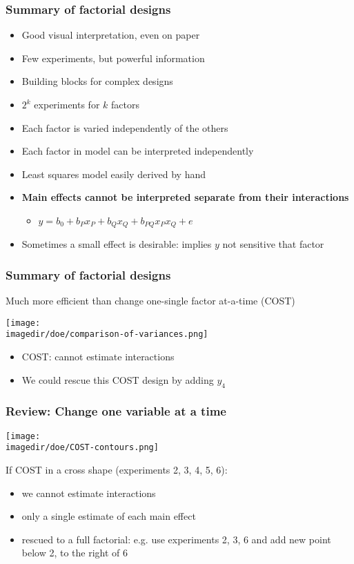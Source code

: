 \begin{frame}\frametitle{Summary of factorial designs}
	\begin{itemize}
		\item	Good visual interpretation, even on paper
		\item	Few experiments, but powerful information
		\item	Building blocks for complex designs
		\item	$2^k$ experiments for $k$ factors
		\item	Each factor is varied independently of the others
		\item	Each factor in model can be interpreted independently
		\item	Least squares model easily derived by hand
		\item	\textbf{Main effects cannot be interpreted separate from their interactions}
		\begin{itemize}
			\item	$y = b_0 + b_P x_P + b_Q x_Q + b_{PQ} x_Px_Q + e$
		\end{itemize}
		\item	Sometimes a small effect is desirable: implies $y$ not sensitive that factor
	\end{itemize}
\end{frame}

\begin{frame}\frametitle{Summary of factorial designs}
	\begin{block}{Much more efficient than change one-single factor at-a-time (COST)}
		\begin{center}
			\texttt{[image: \\imagedir/doe/comparison-of-variances.png]}
		\end{center}
	\end{block}
	\begin{itemize}
		\item	COST: cannot estimate interactions
		\item	We could rescue this COST design by adding $y_4$
	\end{itemize}
\end{frame}

\begin{frame}\frametitle{Review: Change one variable at a time}
	\begin{center}
		\texttt{[image: \\imagedir/doe/COST-contours.png]}
	\end{center}
	If COST in a cross shape (experiments 2, 3, 4, 5, 6):
	\begin{itemize}
		\item	we cannot estimate interactions
		\item	only a single estimate of each main effect
		\item	rescued to a full factorial: e.g. use experiments 2, 3, 6 and add new point below 2, to the right of 6
	\end{itemize}
\end{frame}

